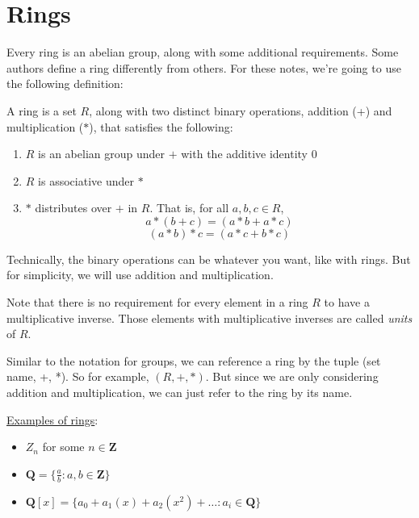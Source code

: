\section{Rings}

\hspace{\parindent}Every ring is an abelian group, along with some additional requirements. Some authors define a ring differently from others. For these notes, we're going to use the following definition:

\begin{definition}
A ring is a set $R$, along with two distinct binary operations, addition (+) and multiplication ($*$), that satisfies the following:
\begin{enumerate}
    \item $R$ is an abelian group under $+$ with the additive identity $0$
    \item $R$ is associative under $*$
    \item $*$ distributes over $+$ in $R$. That is, for all $a, b, c \in R$, 
        $$a*(b+c) = (a*b+a*c)$$
        $$(a*b)*c = (a*c+b*c)$$

\end{enumerate}
\end{definition}

Technically, the binary operations can be whatever you want, like with rings. But for simplicity, we will use addition and multiplication.

Note that there is no requirement for every element in a ring $R$ to have a multiplicative inverse. Those elements with multiplicative inverses are called \emph{units} of $R$.

Similar to the notation for groups, we can reference a ring by the tuple (set name, +, *). So for example, $(R, +, *)$. But since we are only considering addition and multiplication, we can just refer to the ring by its name.

\begin{center}
    \underline{Examples of rings}:
\end{center}

\begin{itemize}
    \item $Z_n$ for some $n\in\mathbf{Z}$
    \item $\mathbf{Q} = \{\frac{a}{b} : a, b\in\mathbf{Z}\}$
    \item $\mathbf{Q}[x] = \{a_0 + a_1(x) + a_2(x^2) + \dots : a_i \in \mathbf{Q}\}$
\end{itemize}

